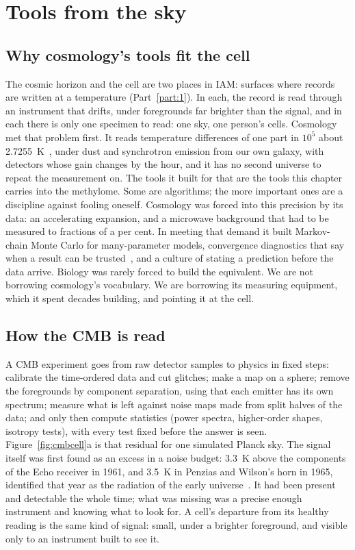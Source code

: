 \chapter{Tools from the sky}\label{ch:skytools}

\section{Why cosmology's tools fit the cell}

The cosmic horizon and the cell are two places in IAM: surfaces where records are written at a temperature (Part~\ref{part:1}). In each, the record is
read through an instrument that drifts, under foregrounds far brighter than the signal, and in each there is only one specimen to read: one sky,
one person's cells. Cosmology met that problem first. It reads temperature differences of one part in $10^5$ about 2.7255~K~\cite{Fixsen2009}, under dust and
synchrotron emission from our own galaxy, with detectors whose gain changes by the hour, and it has no second universe to repeat the
measurement on. The tools it built for that are the tools this chapter carries into the methylome. Some are algorithms; the more important ones
are a discipline against fooling oneself.
Cosmology was forced into this precision by its data: an accelerating expansion, and a microwave background that had to be measured to
fractions of a per cent. In meeting that demand it built Markov-chain Monte Carlo for many-parameter models, convergence diagnostics that
say when a result can be trusted~\cite{Gelman1992}, and a culture of stating a prediction before the data arrive. Biology was rarely forced
to build the equivalent. We are not borrowing cosmology's vocabulary. We are borrowing its measuring equipment, which it spent decades
building, and pointing it at the cell.

\section{How the CMB is read}

A CMB experiment goes from raw detector samples to physics in fixed steps: calibrate the time-ordered data and cut glitches; make a map on a sphere;
remove the foregrounds by component separation, using that each emitter has its own spectrum; measure what is left against noise maps made from
split halves of the data; and only then compute statistics (power spectra, higher-order shapes, isotropy tests), with every test fixed before
the answer is seen. Figure~\ref{fig:cmbcell}a is that residual for one simulated Planck sky.
The signal itself was first found as an excess in a noise budget: 3.3~K above the components of the Echo receiver in 1961, and 3.5~K in
Penzias and Wilson's horn in 1965, identified that year as the radiation of the early universe~\cite{Ohm1961,PenziasWilson1965,Dicke1965,Wilson1979}.
\observed{} It had been present and detectable the whole time; what was missing was a precise enough instrument and knowing what to look for.
A cell's departure from its healthy reading is the same kind of signal: small, under a brighter foreground, and visible only to an
instrument built to see it. \analogy

